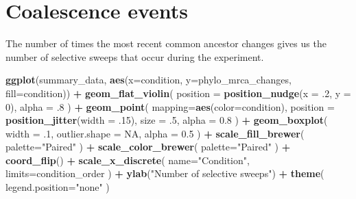 \documentclass[]{book}
\newenvironment{Shaded}{\begin{snugshade}}{\end{snugshade}}
\newcommand{\DataTypeTok}[1]{\textcolor[rgb]{0.13,0.29,0.53}{#1}}
\newcommand{\DecValTok}[1]{\textcolor[rgb]{0.00,0.00,0.81}{#1}}
\newcommand{\FloatTok}[1]{\textcolor[rgb]{0.00,0.00,0.81}{#1}}
\newcommand{\KeywordTok}[1]{\textcolor[rgb]{0.13,0.29,0.53}{\textbf{#1}}}
\newcommand{\NormalTok}[1]{#1}
\newcommand{\OperatorTok}[1]{\textcolor[rgb]{0.81,0.36,0.00}{\textbf{#1}}}
\newcommand{\OtherTok}[1]{\textcolor[rgb]{0.56,0.35,0.01}{#1}}
\newcommand{\StringTok}[1]{\textcolor[rgb]{0.31,0.60,0.02}{#1}}
\begin{document}
\hypertarget{coalescence-events}{%
\section{Coalescence events}\label{coalescence-events}}

The number of times the most recent common ancestor changes gives us the number of selective sweeps that occur during the experiment.

\begin{Shaded}
\begin{Highlighting}[]
\KeywordTok{ggplot}\NormalTok{(summary_data, }\KeywordTok{aes}\NormalTok{(}\DataTypeTok{x=}\NormalTok{condition, }\DataTypeTok{y=}\NormalTok{phylo_mrca_changes, }\DataTypeTok{fill=}\NormalTok{condition)) }\OperatorTok{+}
\StringTok{  }\KeywordTok{geom_flat_violin}\NormalTok{(}
    \DataTypeTok{position =} \KeywordTok{position_nudge}\NormalTok{(}\DataTypeTok{x =} \FloatTok{.2}\NormalTok{, }\DataTypeTok{y =} \DecValTok{0}\NormalTok{),}
    \DataTypeTok{alpha =} \FloatTok{.8}
\NormalTok{  ) }\OperatorTok{+}
\StringTok{  }\KeywordTok{geom_point}\NormalTok{(}
    \DataTypeTok{mapping=}\KeywordTok{aes}\NormalTok{(}\DataTypeTok{color=}\NormalTok{condition),}
    \DataTypeTok{position =} \KeywordTok{position_jitter}\NormalTok{(}\DataTypeTok{width =} \FloatTok{.15}\NormalTok{),}
    \DataTypeTok{size =} \FloatTok{.5}\NormalTok{,}
    \DataTypeTok{alpha =} \FloatTok{0.8}
\NormalTok{  ) }\OperatorTok{+}
\StringTok{  }\KeywordTok{geom_boxplot}\NormalTok{(}
    \DataTypeTok{width =} \FloatTok{.1}\NormalTok{,}
    \DataTypeTok{outlier.shape =} \OtherTok{NA}\NormalTok{,}
    \DataTypeTok{alpha =} \FloatTok{0.5}
\NormalTok{  ) }\OperatorTok{+}
\StringTok{  }\KeywordTok{scale_fill_brewer}\NormalTok{(}
    \DataTypeTok{palette=}\StringTok{"Paired"}
\NormalTok{  ) }\OperatorTok{+}
\StringTok{  }\KeywordTok{scale_color_brewer}\NormalTok{(}
    \DataTypeTok{palette=}\StringTok{"Paired"}
\NormalTok{  ) }\OperatorTok{+}
\StringTok{  }\KeywordTok{coord_flip}\NormalTok{() }\OperatorTok{+}
\StringTok{  }\KeywordTok{scale_x_discrete}\NormalTok{(}
    \DataTypeTok{name=}\StringTok{"Condition"}\NormalTok{,}
    \DataTypeTok{limits=}\NormalTok{condition_order}
\NormalTok{  ) }\OperatorTok{+}
\StringTok{  }\KeywordTok{ylab}\NormalTok{(}\StringTok{"Number of selective sweeps"}\NormalTok{) }\OperatorTok{+}
\StringTok{  }\KeywordTok{theme}\NormalTok{(}
    \DataTypeTok{legend.position=}\StringTok{"none"}
\NormalTok{  )}
\end{Highlighting}
\end{Shaded}
\end{document}
